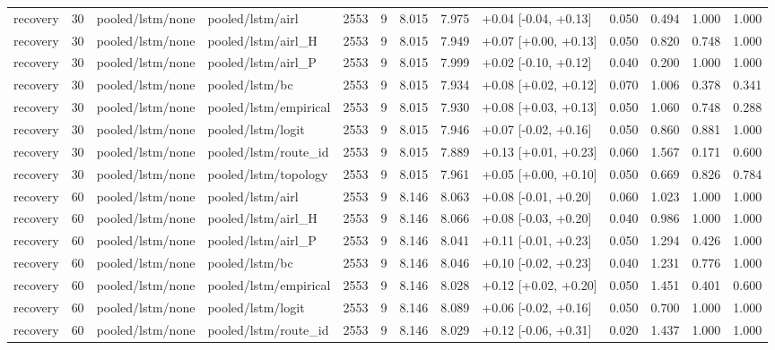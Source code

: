 \begin{tabular}{lrllrrrrlrrll}
recovery & 30 & pooled/lstm/none & pooled/lstm/airl & 2553 & 9 & 8.015 & 7.975 & +0.04 [-0.04, +0.13] & 0.050 & 0.494 & 1.000 & 1.000 \\
recovery & 30 & pooled/lstm/none & pooled/lstm/airl_H & 2553 & 9 & 8.015 & 7.949 & +0.07 [+0.00, +0.13] & 0.050 & 0.820 & 0.748 & 1.000 \\
recovery & 30 & pooled/lstm/none & pooled/lstm/airl_P & 2553 & 9 & 8.015 & 7.999 & +0.02 [-0.10, +0.12] & 0.040 & 0.200 & 1.000 & 1.000 \\
recovery & 30 & pooled/lstm/none & pooled/lstm/bc & 2553 & 9 & 8.015 & 7.934 & +0.08 [+0.02, +0.12] & 0.070 & 1.006 & 0.378 & 0.341 \\
recovery & 30 & pooled/lstm/none & pooled/lstm/empirical & 2553 & 9 & 8.015 & 7.930 & +0.08 [+0.03, +0.13] & 0.050 & 1.060 & 0.748 & 0.288 \\
recovery & 30 & pooled/lstm/none & pooled/lstm/logit & 2553 & 9 & 8.015 & 7.946 & +0.07 [-0.02, +0.16] & 0.050 & 0.860 & 0.881 & 1.000 \\
recovery & 30 & pooled/lstm/none & pooled/lstm/route_id & 2553 & 9 & 8.015 & 7.889 & +0.13 [+0.01, +0.23] & 0.060 & 1.567 & 0.171 & 0.600 \\
recovery & 30 & pooled/lstm/none & pooled/lstm/topology & 2553 & 9 & 8.015 & 7.961 & +0.05 [+0.00, +0.10] & 0.050 & 0.669 & 0.826 & 0.784 \\
recovery & 60 & pooled/lstm/none & pooled/lstm/airl & 2553 & 9 & 8.146 & 8.063 & +0.08 [-0.01, +0.20] & 0.060 & 1.023 & 1.000 & 1.000 \\
recovery & 60 & pooled/lstm/none & pooled/lstm/airl_H & 2553 & 9 & 8.146 & 8.066 & +0.08 [-0.03, +0.20] & 0.040 & 0.986 & 1.000 & 1.000 \\
recovery & 60 & pooled/lstm/none & pooled/lstm/airl_P & 2553 & 9 & 8.146 & 8.041 & +0.11 [-0.01, +0.23] & 0.050 & 1.294 & 0.426 & 1.000 \\
recovery & 60 & pooled/lstm/none & pooled/lstm/bc & 2553 & 9 & 8.146 & 8.046 & +0.10 [-0.02, +0.23] & 0.040 & 1.231 & 0.776 & 1.000 \\
recovery & 60 & pooled/lstm/none & pooled/lstm/empirical & 2553 & 9 & 8.146 & 8.028 & +0.12 [+0.02, +0.20] & 0.050 & 1.451 & 0.401 & 0.600 \\
recovery & 60 & pooled/lstm/none & pooled/lstm/logit & 2553 & 9 & 8.146 & 8.089 & +0.06 [-0.02, +0.16] & 0.050 & 0.700 & 1.000 & 1.000 \\
recovery & 60 & pooled/lstm/none & pooled/lstm/route_id & 2553 & 9 & 8.146 & 8.029 & +0.12 [-0.06, +0.31] & 0.020 & 1.437 & 1.000 & 1.000 \\

\end{tabular}

